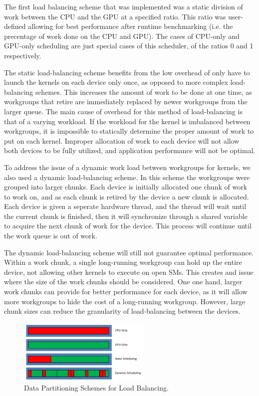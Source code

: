 \documentclass[journal]{IEEEtran}
\begin{document}
The first load balancing scheme that was implemented was a static division of work between
the CPU and the GPU at a specified ratio.  This ratio was user-defined allowing for best 
performance after runtime benchmarking (i.e. the precentage of work done on the CPU and GPU).
The cases of CPU-only and GPU-only scheduling are just special cases of this scheduler, of
the ratios 0 and 1 respectively.

The static load-balancing scheme benefits from the low overhead of only have to launch the
kernels on each device only once, as opposed to more complex load-balancing schemes.  This
increases the amount of work to be done at one time, as workgroups that retire are immediately
replaced by newer workgroups from the larger queue. The main cause of overhead for this method
of load-balancing is that of a varying workload.  If the workload for the kernel is imbalanced
between workgroups, it is impossible to statically determine the proper amount of work
to put on each kernel.  Improper allocation of work to each device will not allow both
devices to be fully utilized, and application performance will not be optimal.

To address the issue of a dynamic work load between workgroups for kernels, we also used
a dynamic load-balancing scheme.  In this scheme the workgroups were grouped into larger
chunks.  Each device is initially allocated one chunk of work to work on, and as each chunk
is retired by the device a new chunk is allocated.  Each device is given a seperate hardware
thread, and the thread will wait until the current chunk is finished, then it will synchronize
through a shared variable to acquire the next chunk of work for the device.  This process
will continue until the work queue is out of work. 

The dynamic load-balancing scheme will still not guarantee optimal performance.
Within a work chunk, a single long-running workgroup can hold up the entire device,
not allowing other kernels to execute on open SMs.  This creates and issue where the
size of the work chunks should be considered.  One one hand, larger work chunks can
provide for better performance for each device, as it will allow more workgroups to
hide the cost of a long-running workgroup.  However, large chunk sizes can reduce
the granularity of load-balancing between the devices.

\begin{figure}[t]
\centering
\includegraphics[width=2.5in]{scheduling}
\caption{Data Partitioning Schemes for Load Balancing.}
\label{fig:scheduling}
\end{figure}
\end{document}
